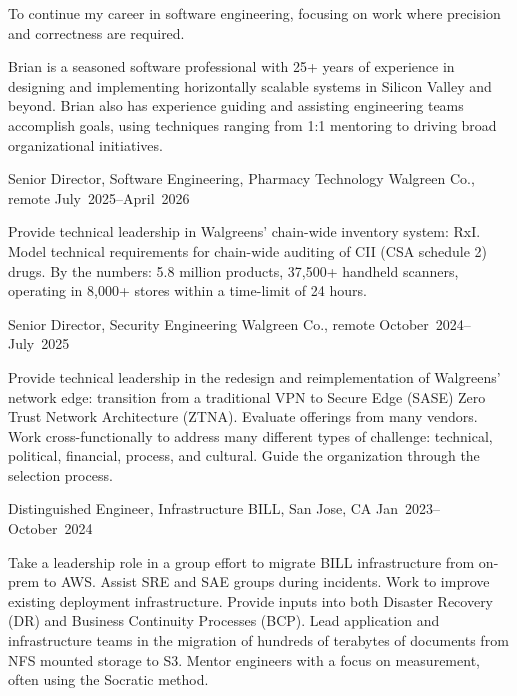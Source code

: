 \documentclass{resume}
\begin{document}
\begin{resume}
\begin{Objective}
To continue my career in software engineering, focusing on work where precision and correctness are required. 
\end{Objective}

\begin{Profile}
Brian is a seasoned software professional with 25+ years of experience
in designing and implementing horizontally scalable systems in Silicon
Valley and beyond. Brian also has experience guiding and assisting
engineering teams accomplish goals, using techniques ranging from 1:1
mentoring to driving broad organizational initiatives.
\end{Profile}

\begin{Employment}
\begin{job}{Senior Director, Software Engineering, Pharmacy Technology}
           {Walgreen Co., remote}
           {July~2025--April~2026}

Provide technical leadership in Walgreens' chain-wide inventory
system: RxI. Model technical requirements for chain-wide auditing of
CII (CSA schedule 2) drugs. By the numbers: 5.8 million products,
37,500+ handheld scanners, operating in 8,000+ stores within a
time-limit of 24 hours.
           
\end{job}

\begin{job}{Senior Director, Security Engineering}
           {Walgreen Co., remote}
           {October~2024--July~2025}

Provide technical leadership in the redesign and reimplementation of
Walgreens' network edge: transition from a traditional VPN to Secure
Edge (SASE) Zero Trust Network Architecture (ZTNA). Evaluate offerings
from many vendors. Work cross-functionally to address many different
types of challenge: technical, political, financial, process, and
cultural. Guide the organization through the selection process.
           
\end{job}

\begin{job}{Distinguished Engineer, Infrastructure}
           {BILL, San Jose, CA}
           {Jan~2023--October~2024}

Take a leadership role in a group effort to migrate BILL
infrastructure from on-prem to AWS. Assist SRE and SAE groups during
incidents. Work to improve existing deployment infrastructure. Provide
inputs into both Disaster Recovery (DR) and Business Continuity
Processes (BCP). Lead application and infrastructure teams in the
migration of hundreds of terabytes of documents from NFS mounted
storage to S3. Mentor engineers with a focus on measurement, often
using the Socratic method.


\end{job}
\end{Employment}
\end{resume}
\end{document}
